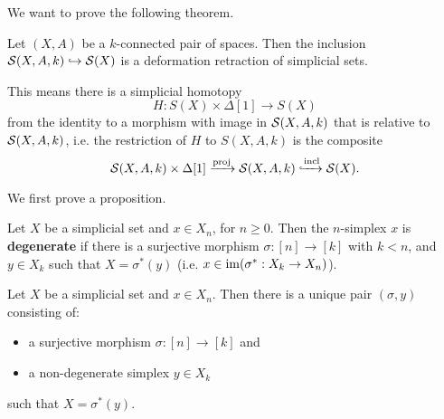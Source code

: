 We want to prove the following theorem.

\begin{theorem}
Let $(X,A)$ be a $k$-connected pair of spaces. Then the inclusion $\S(X,A,k)\hto\S(X)$ is a deformation retraction of simplicial sets.
\end{theorem}

This means there is a simplicial homotopy
\[H:S(X)\times\Delta[1]\to S(X)\]
from the identity to a morphism with image in $\S(X,A,k)$ that is relative to $\S(X,A,k)$, i.e. the restriction of $H$ to $S(X,A,k)$ is the composite
\[\S(X,A,k)\times\Delta[1]\xto{\text{proj}}\S(X,A,k)\xhto{\text{incl}}\S(X).\]

We first prove a proposition.

Let $X$ be a simplicial set and $x\in X_n$, for $n\geq0$. Then the $n$-simplex $x$ is \textbf{degenerate} if there is a surjective morphism $\sigma:[n]\to [k]$ with $k<n$, and $y\in X_k$ such that $X=\sigma^*(y)$ (i.e. $x\in\im(\sigma^*:X_k\to X_n)$).

\begin{proposition}
Let $X$ be a simplicial set and $x\in X_n$. Then there is a unique pair $(\sigma,y)$ consisting of:
\begin{itemize}
    \item a surjective morphism $\sigma: [n]\to [k]$ and
    \item a non-degenerate simplex $y\in X_k$
\end{itemize}
such that $X=\sigma^*(y)$.
\end{proposition}

